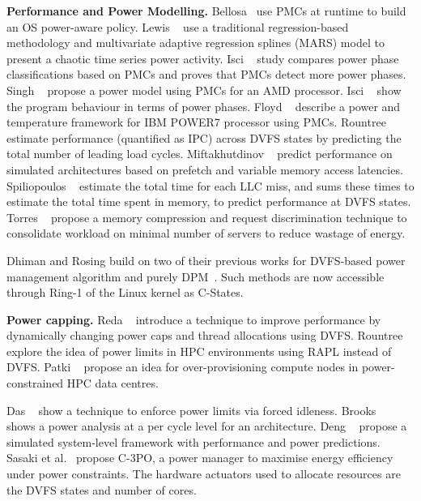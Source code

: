  \textbf{Performance and Power Modelling.} Bellosa~\citep{Bellosa:2000:BED:566726.566736} use PMCs at runtime to build an OS
power-aware policy. Lewis \etal~\citep{Lewis:2010:CAP:1924920.1924929} use a
traditional regression-based methodology and multivariate adaptive regression splines
(MARS) model to present a chaotic time series power activity.  Isci \etal~\citep{1598119}
study compares power phase classifications based on PMCs and proves that PMCs
detect more power phases. Singh \etal~\citep{Singh:2009:RTP:1577129.1577137} propose a
power model using PMCs for an AMD processor. Isci
\etal~\citep{Isci:2003:RPM:956417.956567} show the program behaviour in terms of power
phases. Floyd \etal~\citep{5751940} describe a power and temperature framework for IBM
POWER7 processor using PMCs. Rountree \etal~\citep{6008553} estimate performance
(quantified as IPC) across DVFS states by predicting the total number of leading load
cycles.  Miftakhutdinov \etal~\citep{Miftakhutdinov:2012:PPI:2457472.2457493} predict
performance on simulated architectures based on prefetch and variable memory access
latencies. Spiliopoulos \etal~\citep{6008552} estimate the total time for each LLC miss,
and sums these times to estimate the total time spent in memory, to predict performance at
DVFS states.  Torres \etal~\citep{4536219} propose a memory compression and request
discrimination technique to consolidate workload on minimal number of servers to reduce
wastage of energy. 

Dhiman and Rosing \citep{4838819} build on two of their previous works for DVFS-based
power management algorithm \citep{5514319} and purely
DPM~\citep{Dhiman:2006:DPM:1233501.1233656}. Such methods are now accessible through
Ring-1 of the Linux kernel as C-States. 

\textbf{Power capping.} Reda \etal~\citep{6266671} introduce a technique to improve
performance by dynamically changing power caps and thread allocations using DVFS. 
Rountree \etal~\citep{6270741} explore the idea of power limits in HPC environments using
RAPL instead of DVFS.  Patki \etal~\citep{Patki:2013:EHO:2464996.2465009} propose an
idea for over-provisioning compute nodes in power-constrained HPC data centres.

 Das \etal~\citep{Das09powercapping}  show a technique to enforce power limits via
forced idleness. Brooks \etal~\citep{Brooks:2000:WFA:339647.339657} shows a power analysis
at a per cycle level for an architecture. Deng \etal~\citep{Deng:2012:CCC:2457472.2457494} propose a simulated system-level
framework with performance and power predictions. Sasaki et
al.~\citep{Sasaki:2013:CPO:2523721.2523732} propose C-3PO, a power manager to maximise
energy efficiency under power constraints. The hardware actuators used to allocate
resources are the DVFS states and number of cores.  

